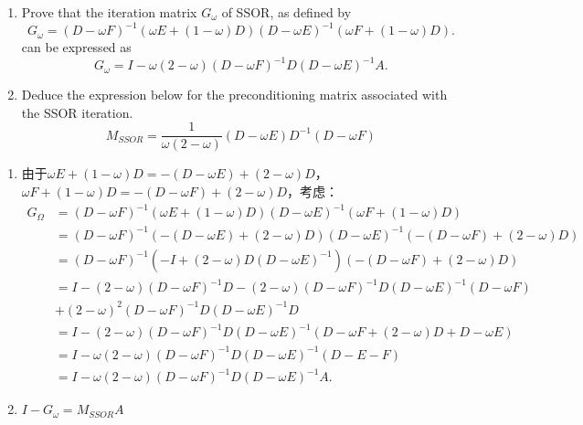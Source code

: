 \documentclass{ctexart}
\newif\ifpreface
\begin{document}
\large
\setlength{\baselineskip}{1.2em}
\ifpreface
    
\newgeometry{left=2cm,right=2cm,top=2cm,bottom=2cm}
\else
{}
\maketitle
\fi

\begin{problem} 
  \begin{enumerate}
    \item Prove that the iteration matrix \( G_{\omega} \) of SSOR, as defined by 
  \[
G_{\omega} = (D - \omega F)^{-1} (\omega E + (1 - \omega) D)
              (D - \omega E)^{-1} (\omega F + (1 - \omega) D).
  \]
  can be expressed as  
\[
G_{\omega} = I - \omega(2 - \omega)(D - \omega F)^{-1} D (D - \omega E)^{-1} A.
\]
\item Deduce the expression below for the preconditioning matrix associated with the SSOR iteration.
  \[
M_{SSOR} = \frac{1}{\omega (2 - \omega)} (D - \omega E) D^{-1} (D - \omega F)
\]
  \end{enumerate}
  
\end{problem}
\begin{solution}
  \begin{enumerate}
    \item 由于\(\omega E + (1-\omega )D = -(D-\omega E)+ (2-\omega )D \)，\(\omega F + (1-\omega )D = -(D-\omega F)+ (2-\omega )D  \)，考虑：
  \[
    \begin{aligned}
      G_{\Omega}&=(D- \omega F)^{-1}(\omega E + (1-\omega )D)(D -\omega E)^{-1}(\omega F + (1-\omega)D)\\ 
      &=(D- \omega F)^{-1}(-(D-\omega E)+ (2-\omega )D )(D -\omega E)^{-1}(-(D-\omega F)+ (2-\omega )D)\\ 
      &=(D- \omega F)^{-1}(-I+ (2-\omega )D (D -\omega E)^{-1})(-(D-\omega F)+ (2-\omega )D)\\ 
      &=I -(2-\omega)(D-\omega F)^{-1}D -(2-\omega)(D-\omega F)^{-1}D(D-\omega E)^{-1}(D-\omega F)\\ 
      &+ (2-\omega )^2(D-\omega F)^{-1}D(D-\omega E)^{-1}D\\ 
      &=I - (2-\omega)(D-\omega F)^{-1}D(D-\omega E)^{-1}(D-\omega F + (2-\omega)D + D - \omega E )\\ 
      &=I - \omega (2-\omega)(D-\omega F)^{-1}D(D-\omega E)^{-1}(D-E-F)\\
      &=I - \omega(2 - \omega)(D - \omega F)^{-1} D (D - \omega E)^{-1} A.
    \end{aligned}
  \]
\item \(I-G_{\omega}=M_{SSOR}A \) 
  \end{enumerate}
\end{solution}
\end{document}
